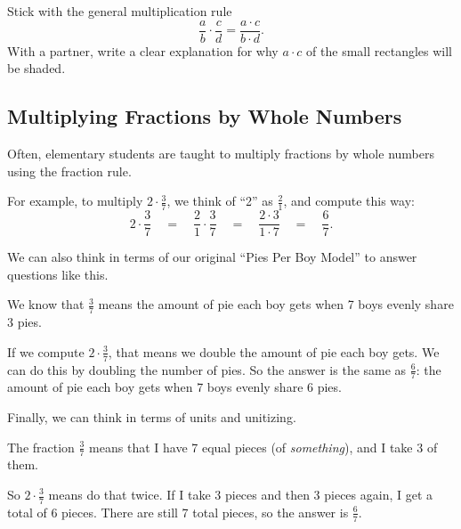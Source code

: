 \begin{thinkpair*}
Stick with the general multiplication rule
\[
\frac a b \cdot \frac cd = \frac{a\cdot c}{b\cdot d}.
\]
With a partner, write a clear explanation for why $a\cdot c$ of the small rectangles will be shaded.

\end{thinkpair*}







\subsection{Multiplying Fractions by Whole Numbers}
Often, elementary students are taught to multiply fractions by whole numbers using the fraction rule.

\begin{example}
For example, to multiply  $2 \cdot \frac 3 7$, we think of ``2'' as $\frac 2 1$, and compute this way:
\[
2 \cdot \frac 37 
\quad
= 
\quad
\frac 21 \cdot \frac 37 
\quad
= 
\quad
\frac{2\cdot3}{1\cdot7}
\quad
 = 
 \quad
 \frac 67.
\]
\end{example}


We can also think in terms of our original ``Pies Per Boy Model'' to answer questions like this.

\begin{example}
We know that $\frac 3 7$ means the amount of pie each boy gets when 7 boys evenly share 3 pies.

If we compute $2\cdot \frac 37$, that means we double the amount of pie each boy gets.  We can do this by doubling the number of pies.  So the answer is the same as $\frac 67$: the amount of pie each boy gets when 7 boys evenly share 6 pies.
\end{example}


Finally, we can think in terms of units and unitizing.

\begin{example}
The fraction $\frac 3 7$ means that I have 7 equal pieces (of \emph{something}), and I take 3 of them.

So $2\cdot \frac 37$ means do that twice.  If I take 3 pieces and then 3 pieces again, I get a total of 6 pieces.  There are still 7 total pieces, so the answer is $\frac 6 7$.

\end{example}


